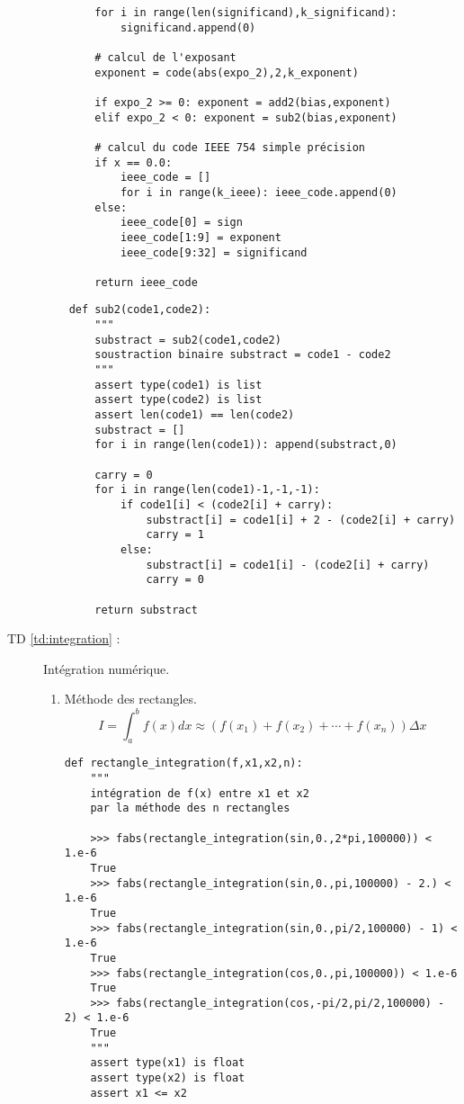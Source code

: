 \begin{description}
\begin{py}{11cm}
\begin{verbatim}
	    for i in range(len(significand),k_significand):
        	significand.append(0)

	    # calcul de l'exposant
	    exponent = code(abs(expo_2),2,k_exponent)

	    if expo_2 >= 0: exponent = add2(bias,exponent)
	    elif expo_2 < 0: exponent = sub2(bias,exponent)

	    # calcul du code IEEE 754 simple précision
	    if x == 0.0:
        	ieee_code = []
        	for i in range(k_ieee): ieee_code.append(0)
	    else:
        	ieee_code[0] = sign
        	ieee_code[1:9] = exponent
        	ieee_code[9:32] = significand

	    return ieee_code
	\end{verbatim}
	\end{py}
	\hfill
	\begin{py}{11cm}
	\begin{verbatim}
	def sub2(code1,code2):
	    """
	    substract = sub2(code1,code2)
	    soustraction binaire substract = code1 - code2
	    """
	    assert type(code1) is list
	    assert type(code2) is list
	    assert len(code1) == len(code2)
	    substract = []
	    for i in range(len(code1)): append(substract,0)

	    carry = 0
	    for i in range(len(code1)-1,-1,-1):
        	if code1[i] < (code2[i] + carry): 
        	    substract[i] = code1[i] + 2 - (code2[i] + carry)
        	    carry = 1
        	else:
        	    substract[i] = code1[i] - (code2[i] + carry)
        	    carry = 0

	    return substract

	\end{verbatim}
	\end{py}
		    
\newpage
\item[TD \ref{td:integration} :] Intégration numérique.
	\begin{enumerate}
	\item Méthode des rectangles.
		$$\displaystyle I = \int_a^b f(x)dx \approx
		\left(f(x_1)+f(x_2)+\cdots+f(x_n)\right)\Delta x$$
	\begin{py}{20cm}
	\begin{lstlisting}[title={\bf Intégration : méthode des rectangles}]
def rectangle_integration(f,x1,x2,n):
    """
    intégration de f(x) entre x1 et x2
    par la méthode des n rectangles

    >>> fabs(rectangle_integration(sin,0.,2*pi,100000)) < 1.e-6
    True
    >>> fabs(rectangle_integration(sin,0.,pi,100000) - 2.) < 1.e-6
    True
    >>> fabs(rectangle_integration(sin,0.,pi/2,100000) - 1) < 1.e-6
    True
    >>> fabs(rectangle_integration(cos,0.,pi,100000)) < 1.e-6
    True
    >>> fabs(rectangle_integration(cos,-pi/2,pi/2,100000) - 2) < 1.e-6
    True
    """
    assert type(x1) is float
    assert type(x2) is float
    assert x1 <= x2


\end{lstlisting}
\end{py}
\end{enumerate}
\end{description}
